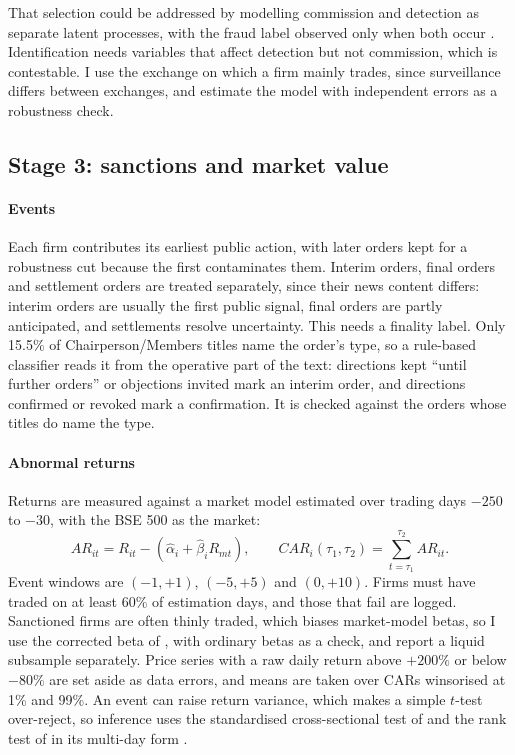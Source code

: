 \documentclass[letterpaper,11pt,leqno]{article}
\begin{document}
That selection could be addressed by modelling commission and detection as separate latent processes, with the fraud label observed only when both occur \citep{WWY10}. Identification needs variables that affect detection but not commission, which is contestable. I use the exchange on which a firm mainly trades, since surveillance differs between exchanges, and estimate the model with independent errors as a robustness check.

\subsection{Stage 3: sanctions and market value}\label{s:stage3}

\paragraph{Events} Each firm contributes its earliest public action, with later orders kept for a robustness cut because the first contaminates them. Interim orders, final orders and settlement orders are treated separately, since their news content differs: interim orders are usually the first public signal, final orders are partly anticipated, and settlements resolve uncertainty. This needs a finality label. Only 15.5\% of Chairperson/Members titles name the order's type, so a rule-based classifier reads it from the operative part of the text: directions kept ``until further orders'' or objections invited mark an interim order, and directions confirmed or revoked mark a confirmation. It is checked against the orders whose titles do name the type.

\paragraph{Abnormal returns} Returns are measured against a market model estimated over trading days $-250$ to $-30$, with the BSE 500 as the market:
\begin{equation}
AR_{it} = R_{it} - (\hat{\alpha}_i + \hat{\beta}_i R_{mt}), \qquad CAR_i(\tau_1, \tau_2) = \sum_{t=\tau_1}^{\tau_2} AR_{it}.
\label{e:car}\end{equation}
Event windows are $(-1,+1)$, $(-5,+5)$ and $(0,+10)$. Firms must have traded on at least 60\% of estimation days, and those that fail are logged. Sanctioned firms are often thinly traded, which biases market-model betas, so I use the corrected beta of \citet{D79}, with ordinary betas as a check, and report a liquid subsample separately. Price series with a raw daily return above $+200\%$ or below $-80\%$ are set aside as data errors, and means are taken over CARs winsorised at 1\% and 99\%. An event can raise return variance, which makes a simple $t$-test over-reject, so inference uses the standardised cross-sectional test of \citet{BMP91} and the rank test of \citet{C89} in its multi-day form \citep{C92}.
\end{document}
